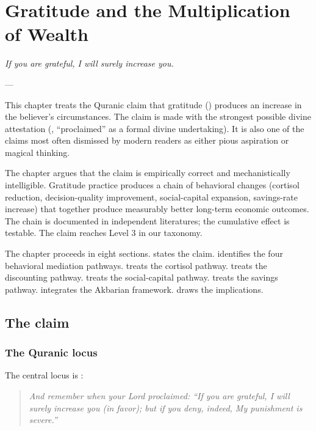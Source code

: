 \chapter{Gratitude and the Multiplication of Wealth}
\label{ch:gratitude}

\epigraph{\itshape If you are grateful, I will surely increase you.}
{--- }

\noindent
This chapter treats the Quranic claim that gratitude ()
produces an increase in the believer's circumstances. The claim is
made with the strongest possible divine attestation
(, ``proclaimed'' as a formal divine
undertaking). It is also one of the claims most often dismissed by
modern readers as either pious aspiration or magical thinking.

The chapter argues that the claim is empirically correct and
mechanistically intelligible. Gratitude practice produces a chain
of behavioral changes (cortisol reduction, decision-quality
improvement, social-capital expansion, savings-rate increase) that
together produce measurably better long-term economic outcomes.
The chain is documented in independent literatures; the cumulative
effect is testable. The claim reaches Level 3 in our taxonomy.

The chapter proceeds in eight sections. 
states the claim.  identifies the four
behavioral mediation pathways.  treats the
cortisol pathway.  treats the
discounting pathway.  treats the social-capital
pathway.  treats the savings pathway.
 integrates the Akbarian framework.
 draws the implications.

\section{The claim}
\label{sec:grat-claim}

\subsection{The Quranic locus}

The central locus is :

\begin{quote}
\textit{And remember when your Lord proclaimed: ``If you are
grateful, I will surely increase you (in favor); but if you deny,
indeed, My punishment is severe.''}
\end{quote}

